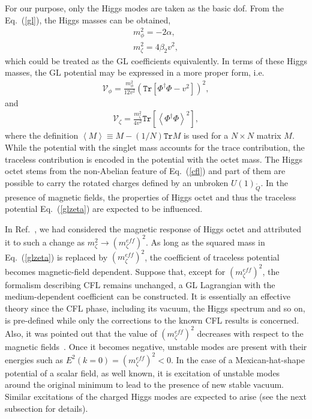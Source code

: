 For our purpose, only the Higgs modes are taken as the basic dof. From the Eq.~(\ref{gl}), the Higgs
masses can be obtained,
\begin{eqnarray}
m_\phi^2=-2\alpha,\\ m_\zeta^2=4\beta_2
	v^2,\label{mhiggs}
\end{eqnarray}
which could be treated as the GL coefficients equivalently. In terms of these Higgs masses, the GL
potential may be expressed in a more proper form, i.e.
\begin{eqnarray}
\mathcal{V}_\phi=
\frac{m_\phi^2}{12v^2}(\texttt{Tr}[\Phi^\dagger\Phi-v^2])^2,
\label{glmphi}
\end{eqnarray}
and
\begin{eqnarray}
\mathcal{V}_\zeta=
\frac{m_\zeta^2}{4v^2}\texttt{Tr}\left[\left<\Phi^\dagger\Phi\right>^2\right],
\label{glzeta}
\end{eqnarray}
where the definition $\left<M\right>\equiv M-(1/N)\texttt{Tr}M$ is used for a $N\times N$ matrix $M$.
While the potential with the singlet mass accounts for the trace contribution, the traceless
contribution is encoded in the potential with the octet mass. The Higgs octet stems from the non-Abelian
feature of Eq.~(\ref{cfl}) and part of them are possible to carry the rotated charges defined by an
unbroken $U(1)_{\widetilde{Q}}$. In the presence of magnetic fields,
the properties of Higgs octet and thus the traceless potential Eq.~(\ref{glzeta}) are expected to
be influenced.

In Ref.~\cite{zhang2015magnetic}, we had considered the magnetic response of Higgs octet  and attributed it to such a change as $m_\zeta^2 \rightarrow (m_\zeta^{eff})^2$.
As long as the squared mass in Eq.~(\ref{glzeta}) is replaced by $(m_\zeta^{eff})^2$, the coefficient of traceless potential becomes magnetic-field dependent. Suppose that, except for $(m_\zeta^{eff})^2$, the formalism describing CFL remains unchanged, a GL Lagrangian with the medium-dependent coefficient can be constructed. 
It is essentially an effective theory since the CFL phase, including its vacuum, the Higgs spectrum and so on, is pre-defined while only the corrections to the known CFL results is concerned. 
Also, it was pointed out that the value of $(m_\zeta^{eff})^2$ decreases with respect to the magnetic fields~\cite{zhang2015magnetic}. Once it becomes negative, unstable modes are present with their energies such as $E^2(k=0)=(m_\zeta^{eff})^2<0$.
In the case of a Mexican-hat-shape potential of a scalar field, as well known, it is excitation of unstable modes around the original minimum to lead to the presence of new stable vacuum.  
Similar excitations of the charged Higgs modes are expected to arise (see the next subsection for details).

